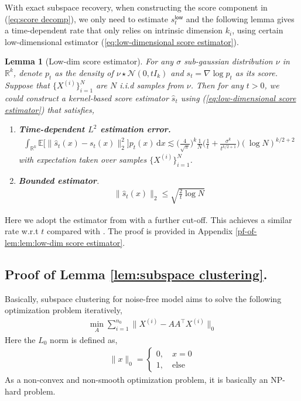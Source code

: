 \documentclass{article}
\newcommand{\diff}{\,\mathrm{d}}
\newcommand{\low}{\mathsf{low}}
\theoremstyle{plain}
\newtheorem{lemma}{\bf Lemma}
\theoremstyle{remark}
\begin{document}
With exact subspace recovery, when constructing the score component in (\ref{eq:score decomp}), we only need to estimate $s_t^\low$ 
and the following lemma gives a time-dependent rate that only relies on intrinsic dimension $k_i$, using certain low-dimensional estimator (\ref{eq:low-dimensional score estimator}).
\begin{lemma}[Low-dim score estimator]
    \label{lem:low-dim score estimator}
    For any $\sigma$ sub-gaussian distribution $\nu$ in $\mathbb{R}^k$, denote $p_t$ as the density of $\nu \star \mathcal{N}(0,tI_k)$ and $s_t = \nabla \log p_t$ as its score. Suppose that $\{ X^{(i)}\}_{i=1}^N$ are $N$ i.i.d samples from $\nu$. 
    Then for any $t>0$, we could construct a kernel-based score estimator $\widehat{s}_t$ using (\ref{eq:low-dimensional score estimator}) that satisfies, 
    \begin{enumerate}
        \item \textbf{Time-dependent $L^2$ estimation error.}
        \begin{align*}
            \int_{\mathbb{R}^k} \mathbb{E}\big[\big\| \widehat{s}_t(x) - s_t(x)\big\|_2^2 \big] p_t(x) \diff x \lesssim  \Big( \frac{4}{\sqrt{\pi}}\Big)^{k} \frac{1}{N} \Big( \frac{1}{t} + \frac{\sigma^k }{ t^{k/2+1}}\Big) (\log N)^{k/2+2} 
        \end{align*}
        with expectation taken over samples $\{ X^{(i)}\}_{i=1}^N$. 
        \item \textbf{Bounded estimator}.
        \begin{align*}
            \| \widehat{s}_t(x) \| _2 \leq \sqrt{\frac{2}{t}\log N}
        \end{align*}
    \end{enumerate}
\end{lemma}
Here we adopt the estimator from \citet{cai2025minimaxoptimalityprobabilityflow} with a further cut-off. 
This achieves a similar rate w.r.t $t$ compared with \citet{zhang2024minimaxoptimalityscorebaseddiffusion,cai2025minimaxoptimalityprobabilityflow}. The proof is provided in Appendix \ref{pf-of-lem:lem:low-dim score estimator}.

\subsection{Proof of Lemma \ref{lem:subspace clustering}.}
\label{pf-of-lemma:lem:subspace clustering}
Basically, subspace clustering for noise-free model aims to solve the following optimization problem iteratively, 
\begin{align*}
    \min_{A} \sum_{i=1}^{n_0} \| X^{(i)}-AA^{\top}X^{(i)}\|_0
\end{align*}
Here the $L_0$ norm is defined as, 
\begin{align*}
    \| x\|_0 = 
    \begin{cases}
        0 , \quad x=0\\
        1, \quad \text{else}
    \end{cases}
\end{align*}
As a non-convex and non-smooth optimization problem, it is basically an NP-hard problem. 
\end{document}
